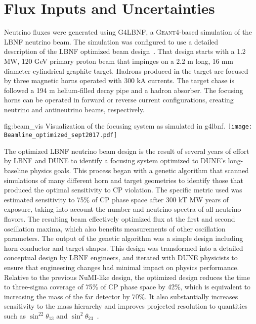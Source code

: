 \section{Flux Inputs and Uncertainties}\label{sec:nu-osc-05}
\label{sec:physics-lbnosc-flux}

Neutrino fluxes were generated using G4LBNF, a \textsc{Geant}4\xspace-based simulation of the LBNF neutrino beam.  The simulation was configured to use a detailed description of the LBNF optimized beam design~\cite{optimizedbeamcdr}.  That design starts with a 1.2 MW, 120 GeV primary proton beam that impinges on a 2.2 m long, 16 mm diameter cylindrical graphite target.  Hadrons produced in the target are focused by three magnetic horns operated with 300 kA currents.  The target chase is followed a 194 m helium-filled decay pipe and a hadron absorber.  The focusing horns can be operated in forward or reverse current configurations, creating neutrino and antineutrino beams, respectively.   

\begin{dunefigure}{fig:beam_vis}
{Visualization of the focusing system as simulated in g4lbnf.}
    \texttt{[image: Beamline\_optimized\_sept2017.pdf]}\end{dunefigure}


The optimized LBNF neutrino beam design is the result of several years of effort by LBNF and DUNE to identify a focusing system optimized to DUNE's long-baseline physics goals.  This process began with a genetic algorithm that scanned simulations of many different horn and target geometries to identify those that produced the optimal sensitivity to CP violation.  The specific metric used was estimated sensitivity to 75\% of CP phase space after 300 kT MW years of exposure, taking into account the number and neutrino spectra of all neutrino flavors. The resulting beam effectively optimized flux at the first and second oscillation maxima, which also benefits measurements of other oscillation parameters.  The output of the genetic algorithm was a simple design including horn conductor and target shapes.  This design was transformed into a detailed conceptual design by LBNF engineers, and iterated with DUNE physicists to ensure that engineering changes had minimal impact on physics performance.  Relative to the previous NuMI-like design, the optimized design reduces the time to three-sigma coverage of 75\% of CP phase space by 42\%, which is equivalent to increasing the mass of the far detector by 70\%.  It also substantially increases sensitivity to the mass hierarchy and improves projected resolution to quantities such as $\sin^22\theta_{13}$ and $\sin^2\theta_{23}$~\cite{fields_doc_2901}.        

